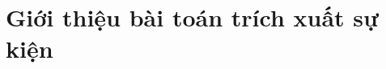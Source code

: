 \chapter{Giới thiệu bài toán trích xuất sự kiện}

\ifpdf
    \graphicspath{{1/figures/PNG/}{1/figures/PDF/}{1/figures/}}
\else
    \graphicspath{{1/figures/EPS/}{1/figures/}}
\fi











